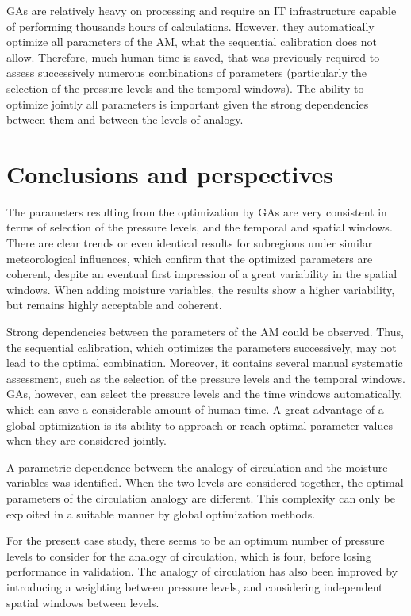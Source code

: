 \documentclass[review]{elsarticle}
\begin{document}
GAs are relatively heavy on processing and require an IT infrastructure capable of performing thousands hours of calculations. However, they automatically optimize all parameters of the AM, what the sequential calibration does not allow. Therefore, much human time is saved, that was previously required to assess successively numerous combinations of parameters (particularly the selection of the pressure levels and the temporal windows). The ability to optimize jointly all parameters is important given the strong dependencies between them and between the levels of analogy.


\section{Conclusions and perspectives}
\label{sec:conclusions}


The parameters resulting from the optimization by GAs are very consistent in terms of selection of the pressure levels, and the temporal and spatial windows. There are clear trends or even identical results for subregions under similar meteorological influences, which confirm that the optimized parameters are coherent, despite an eventual first impression of a great variability in the spatial windows. When adding moisture variables, the results show a higher variability, but remains highly acceptable and coherent.

Strong dependencies between the parameters of the AM could be observed. Thus, the sequential calibration, which optimizes the parameters successively, may not lead to the optimal combination. Moreover, it contains several manual systematic assessment, such as the selection of the pressure levels and the temporal windows. GAs, however, can select the pressure levels and the time windows automatically, which can save a considerable amount of human time. A great advantage of a global optimization is its ability to approach or reach optimal parameter values when they are considered jointly. 

A parametric dependence between the analogy of circulation and the moisture variables was identified. When the two levels are considered together, the optimal parameters of the circulation analogy are different. This complexity can only be exploited in a suitable manner by global optimization methods.

For the present case study, there seems to be an optimum number of pressure levels to consider for the analogy of circulation, which is four, before losing performance in validation. The analogy of circulation has also been improved by introducing a weighting between pressure levels, and considering independent spatial windows between levels.
\end{document}
